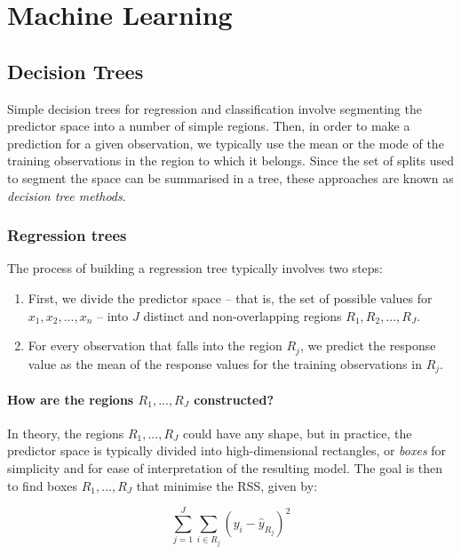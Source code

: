 \section{Machine Learning}


\subsection{Decision Trees}

Simple decision trees for regression and classification involve segmenting the predictor space into a number of simple regions. Then, in order to make a
prediction for a given observation, we typically use the mean or the mode of the training observations in the region to which it belongs. Since the set of splits used to segment the space can be summarised in a tree, these approaches are known as \textit{decision tree methods}.

\subsubsection{Regression trees}
The process of building a regression tree typically involves two steps:

\begin{enumerate}
    \item First, we divide the predictor space -- that is, the set of possible values for $x_1, x_2, ...,
x_n$ -- into $J$ distinct and non-overlapping regions $R_1, R_2, ..., R_J$.
    \item For every observation that falls into the region $R_j$, we predict the response value as the mean of the response values for the training observations in $R_j$.
\end{enumerate}

\paragraph{How are the regions $R_1, ..., R_J$ constructed?}
In theory, the regions $R_1, ..., R_J$ could have any shape, but in practice, the predictor space is typically divided into high-dimensional
rectangles, or \textit{boxes} for simplicity and for ease of interpretation of the resulting model. The goal is then to find boxes $R_1, ..., R_J$ that minimise the RSS, given by:

\begin{equation}
    \sum_{j=1}^{J} \sum_{i \in R_j} (y_i - \hat{y}_{R_j})^2
\end{equation}


